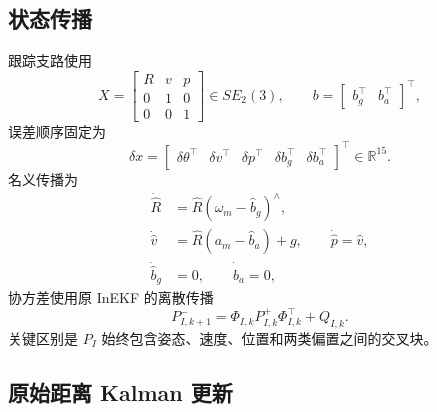 \documentclass[11pt,a4paper]{ctexart}
\newcommand{\R}{\mathbb{R}}
\begin{document}
\subsection{状态传播}

跟踪支路使用
\begin{equation}
X=
\begin{bmatrix}
R&v&p\\0&1&0\\0&0&1
\end{bmatrix}\in SE_2(3),\qquad
b=\begin{bmatrix}b_g^\top&b_a^\top\end{bmatrix}^\top ,
\end{equation}
误差顺序固定为
\begin{equation}
\delta x=
\begin{bmatrix}
\delta\theta^\top&\delta v^\top&\delta p^\top&
\delta b_g^\top&\delta b_a^\top
\end{bmatrix}^\top\in\R^{15}.
\end{equation}
名义传播为
\begin{align}
\dot{\hat R}&=\hat R(\omega_m-\hat b_g)^\wedge,\\
\dot{\hat v}&=\hat R(a_m-\hat b_a)+g,\qquad
\dot{\hat p}=\hat v,\\
\dot{\hat b}_g&=0,\qquad \dot{\hat b}_a=0,
\end{align}
协方差使用原 InEKF 的离散传播
\begin{equation}
P_{I,k+1}^{-}=\Phi_{I,k}P_{I,k}^{+}\Phi_{I,k}^\top+Q_{I,k}.
\end{equation}
关键区别是 $P_I$ 始终包含姿态、速度、位置和两类偏置之间的交叉块。

\subsection{原始距离 Kalman 更新}
\end{document}
